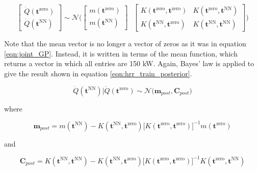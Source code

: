 \documentclass{article}
\begin{document}
\begin{equation}
  \label{eqn:joint_hrr_gp}
  \begin{bmatrix}
  \dot{Q}(\boldsymbol{t}^{\text{zero}}) \\
  \dot{Q}(\boldsymbol{t}^{\text{NN}})
  \end{bmatrix} \sim 
  \mathcal{N} \Bigg( \begin{bmatrix}
  m(\boldsymbol{t}^{\text{zero}}) \\
  m(\boldsymbol{t}^{\text{NN}})
  \end{bmatrix}  \ \ \ 
  \begin{bmatrix}
 K(\boldsymbol{t}^{\text{zero}}, \boldsymbol{t}^{\text{zero}}) & K(\boldsymbol{t}^{\text{zero}}, \boldsymbol{t}^{\text{NN}}) \\ 
   K(\boldsymbol{t}^{\text{NN}}, \boldsymbol{t}^{\text{zero}}) &  K(\boldsymbol{t}^{\text{NN}}, \boldsymbol{t}^{\text{NN}}) 
  \end{bmatrix}
  \Bigg)
\end{equation}

\noindent Note that the mean vector is no longer a vector of zeros as it was in equation \ref{eqn:joint_GP}.  Instead, it is written in terms of the mean function, which returns a vector in which all entries are 150 kW. Again, Bayes' law is applied to give the result shown in equation \ref{eqn:hrr_train_posterior}.

\begin{equation}
  \label{eqn:hrr_train_posterior}
 \dot{Q}(\boldsymbol{t}^{\text{NN}})  \Big| \dot{Q}(\boldsymbol{t}^{\text{zero}}) \sim 
 \mathcal{N}\Big(\boldsymbol{m}_{post}, \boldsymbol{C}_{post}\Big)
\end{equation}

\noindent where 

$$
\boldsymbol{m}_{post} = 
m(\boldsymbol{t}^{\text{NN}}) -  K(\boldsymbol{t}^{\text{NN}}, \boldsymbol{t}^{\text{zero}})\Big[K(\boldsymbol{t}^{\text{zero}}, \boldsymbol{t}^{\text{zero}}) \Big]^{-1} m(\boldsymbol{t}^{\text{zero}})
$$

\noindent and 

$$
\boldsymbol{C}_{post} = K(\boldsymbol{t}^{\text{NN}}, \boldsymbol{t}^{\text{NN}}) -  K( \boldsymbol{t}^{\text{NN}}, \boldsymbol{t}^{\text{zero}})\Big[K(\boldsymbol{t}^{\text{zero}}, \boldsymbol{t}^{\text{zero}})\Big]^{-1}K(\boldsymbol{t}^{\text{zero}},\boldsymbol{t}^{\text{NN}})
$$
\end{document}
